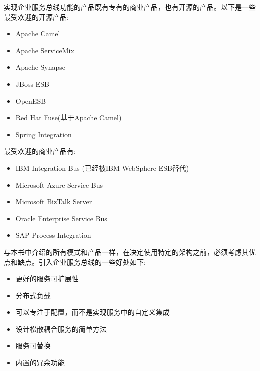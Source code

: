 实现企业服务总线功能的产品既有专有的商业产品，也有开源的产品。以下是一些最受欢迎的开源产品:

\begin{itemize}
\item 
Apache Camel

\item 
Apache ServiceMix

\item 
Apache Synapse

\item 
JBoss ESB

\item 
OpenESB

\item 
Red Hat Fuse(基于Apache Camel)

\item 
Spring Integration
\end{itemize}

最受欢迎的商业产品有:

\begin{itemize}
\item 
IBM Integration Bus (已经被IBM WebSphere ESB替代)

\item 
Microsoft Azure Service Bus

\item 
Microsoft BizTalk Server

\item 
Oracle Enterprise Service Bus

\item 
SAP Process Integration
\end{itemize}

与本书中介绍的所有模式和产品一样，在决定使用特定的架构之前，必须考虑其优点和缺点。引入企业服务总线的一些好处如下:

\begin{itemize}
\item 
更好的服务可扩展性

\item 
分布式负载

\item 
可以专注于配置，而不是实现服务中的自定义集成

\item 
设计松散耦合服务的简单方法

\item 
服务可替换

\item 
内置的冗余功能
\end{itemize}

